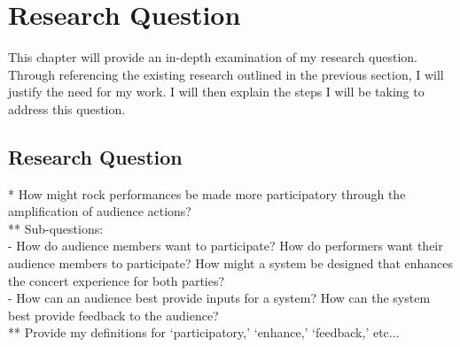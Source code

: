 \chapter{Research Question}

This chapter will provide an in-depth examination of my research question. Through referencing the existing research outlined in the previous section, I will justify the need for my work. I will then explain the steps I will be taking to address this question.

\section{Research Question}

* How might rock performances be made more participatory through the amplification of audience actions?\\
** Sub-questions:\\
- How do audience members want to participate? How do performers want their audience members to participate? How might a system be designed that enhances the concert experience for both parties?\\
- How can an audience best provide inputs for a system? How can the system best provide feedback to the audience?\\
** Provide my definitions for `participatory,' `enhance,' `feedback,' etc...\\

